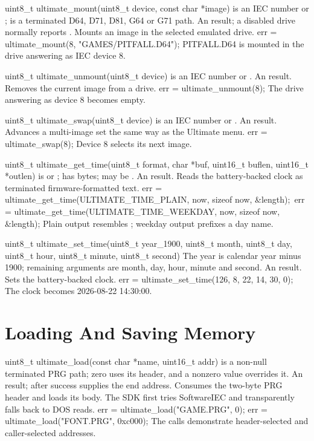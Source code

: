 \begin{referencechapter}
{uint8\_t ultimate\_mount(uint8\_t device, const char *image)}
{ is an IEC number or ;  is a
terminated D64, D71, D81, G64 or G71 path.}
{An  result; a disabled drive normally reports
.}
{Mounts an image in the selected emulated drive.}
{err = ultimate\_mount(8, "GAMES/PITFALL.D64");}
{PITFALL.D64 is mounted in the drive answering as IEC device 8.}

{uint8\_t ultimate\_unmount(uint8\_t device)}
{ is an IEC number or .}
{An  result.}
{Removes the current image from a drive.}
{err = ultimate\_unmount(8);}
{The drive answering as device 8 becomes empty.}

{uint8\_t ultimate\_swap(uint8\_t device)}
{ is an IEC number or .}
{An  result.}
{Advances a multi-image set the same way as the Ultimate menu.}
{err = ultimate\_swap(8);}
{Device 8 selects its next image.}

{uint8\_t ultimate\_get\_time(uint8\_t format, char *buf, uint16\_t buflen, uint16\_t *outlen)}
{ is  or
;  has  bytes;
 may be .}
{An  result.}
{Reads the battery-backed clock as terminated firmware-formatted text.}
{err = ultimate\_get\_time(ULTIMATE\_TIME\_PLAIN, now, sizeof now, \&length);\
err = ultimate\_get\_time(ULTIMATE\_TIME\_WEEKDAY, now, sizeof now, \&length);}
{Plain output resembles \cmd{2026/08/22 14:30:00}; weekday output prefixes a
day name.}

{uint8\_t ultimate\_set\_time(uint8\_t year\_1900, uint8\_t month, uint8\_t day, uint8\_t hour, uint8\_t minute, uint8\_t second)}
{The year is calendar year minus 1900; remaining arguments are month, day,
hour, minute and second.}
{An  result.}
{Sets the battery-backed clock.}
{err = ultimate\_set\_time(126, 8, 22, 14, 30, 0);}
{The clock becomes 2026-08-22 14:30:00.}

\section{Loading And Saving Memory}

{uint8\_t ultimate\_load(const char *name, uint16\_t addr)}
{ is a non-null terminated PRG path; zero  uses its header,
and a nonzero value overrides it.}
{An  result; after success
 supplies the end address.}
{Consumes the two-byte PRG header and loads its body. The SDK first tries
SoftwareIEC and transparently falls back to DOS reads.}
{err = ultimate\_load("GAME.PRG", 0); err = ultimate\_load("FONT.PRG", 0xc000);}
{The calls demonstrate header-selected and caller-selected addresses.}


\end{referencechapter}
